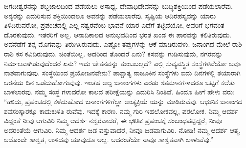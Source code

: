 ಜಗದೀಶ್ವರನನ್ನು ಶಬ್ದಜಾಲದಿಂದ ಪಡೆಯಲು ಅಸಾಧ್ಯ. ದೇವಾಧಿದೇವನನ್ನು ಬುದ್ಧಿಶಕ್ತಿಯಿಂದ ಪಡೆಯಲಾರೆವು. ಅನ್ಯರನ್ನು ಎದುರಿಸುವ ಶಕ್ತಿಯಿಂದಲೂ ಅವನನ್ನು ಪಡೆಯಲಾರೆವು. ಸೃಷ್ಟಿಯ ಆದಿರಹಸ್ಯವನ್ನು ಯಾರು ತಿಳಿದಿರುವರೋ, ಪ್ರಪಂಚದಲ್ಲಿ ಎಲ್ಲ ನಶ್ವರವೆಂಬ ಭಾವನೆ ಯಾರ ಎದೆಗೆ ತಟ್ಟಿದೆಯೋ, ಅವರಿಗೆ ಭಗವಂತ ದೊರಕುವುದು. ಇತರರಿಗೆ ಅಲ್ಲ. ಆನಾದಿಕಾಲದ ಅನುಭವದಿಂದ ಭರತ ಖಂಡ ಈ ಪಾಠವನ್ನು ಕಲಿತಿರುವುದು. ಅವನೆಡೆಗೆ ತನ್ನ ಮೊಗವನ್ನು ತಿರುಗಿಸಿರುವುದು. ಎಷ್ಟೋ ತಪ್ಪುಗಳನ್ನು ಆಕೆ ಮಾಡಿರುವಳು. ಜನಾಂಗದ ಮೇಲೆ ರಾಶಿ ರಾಶಿ ಕಸ ಕವಿದಿರುವುದು. ಚಿಂತೆಯಿಲ್ಲ. ಅದರಿಂದ ತೊಂದರೆ ಏನು? ಕಸವನ್ನು ಗುಡಿಸುವುದು, ನಗರವನ್ನು ನಿರ್ಮಲವಾಗಿಡುವುದೆಂದರೆ ಏನು? ಇದು ಚೇತನವನ್ನು ತುಂಬಬಲ್ಲದೆ? ಎಲ್ಲಿ ಸುವ್ಯವಸ್ಥಿತ ಸಂಸ್ಥೆಗಳಿವೆಯೋ ಅವೂ ನಾಶವಾಗುವುವು. ಸಂಸ್ಥೆಯಿಂದ ಪ್ರಯೋಜನವೇನು? ಪಾಶ್ಚಾತ್ಯ ನಾಜೂಕಿನ ಸಂಸ್ಥೆಗಳು ಐದು ದಿನಗಳಲ್ಲಿ ತಯಾರಾಗಿ ಆರನೆಯ ದಿನ ಒಡೆದುಹೋಗುವುವು. ಇಂತಹ ಅಲ್ಪ ಜನಾಂಗಗಳು ಎರಡು ಶತಮಾನಗಳಾದರೂ ಒಟ್ಟಿಗೆ ಕಲೆತು ಬಾಳಲಾರವು. ನಮ್ಮ ಸಂಸ್ಥೆ ಗಳಾದರೋ ಕಾಲದ ಪರೀಕ್ಷೆಯನ್ನು ಎದುರಿಸಿ ನಿಂತಿವೆ. ಹಿಂದೂ ಹೀಗೆ ಹೇಳು ವರು: “ಹೌದು, ಪ್ರಪಂಚದಲ್ಲಿ ಕಳೆದುಹೋದ ಜನಾಂಗಗಳಿಗೆಲ್ಲಾ ಅಂತ್ಯಕ್ರಿಯೆ ಯನ್ನು ಮಾಡಿರುವೆವು. ಆಧುನಿಕ ಜನಾಂಗದ ಶವಸಂಸ್ಕಾರಕ್ಕೂ ಕಾದುಕುಳಿತಿ ರುವೆವು. ಇದಕ್ಕೆ ಕಾರಣ. ನಮ್ಮ ಗುರಿ ಇಹಲೋಕವಲ್ಲ, ಪರಲೋಕ. ನಿಮ್ಮ ಆದರ್ಶ ವಿದ್ದಂತೆ ನೀವು ಆಗುವಿರಿ ನಿಮ್ಮ ಆದರ್ಶ ನಶ್ವರವಾದರೆ, ಈ ಭೌತಿಕ ಪ್ರಪಂಚಕ್ಕೆ ಸಂಬಂಧಪಟ್ಟಿದ್ದರೆ, ನೀವೂ ಅದರಂತೆಯೆ ಆಗುವಿರಿ. ನಿಮ್ಮ ಆದರ್ಶ ಜಡ ವಸ್ತುವಾದರೆ, ನೀವೂ ಜಡವಾಗುವಿರಿ. ನೋಡಿ! ನಮ್ಮ ಆದರ್ಶ ಆತ್ಮ, ಅದೊಂದೇ ಶಾಶ್ವತ, ಉಳಿದವು ಯಾವುದೂ ಅಲ್ಲ. ಅದರಂತೆಯೇ ನಾವೂ ಶಾಶ್ವತವಾಗಿ ಬಾಳುವೆವು.”

